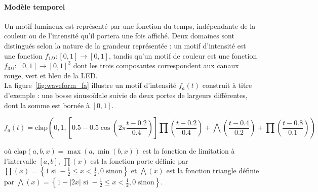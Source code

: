 \paragraph{Modèle temporel} Un motif lumineux est représenté par une fonction du temps, indépendante de la couleur ou de
l'intensité qu'il portera une fois affiché. Deux domaines sont distingués selon la nature de la grandeur représentée : un motif
d'intensité est une fonction $f_{1D} : [0,1] \to [0,1]$, tandis qu'un motif de couleur est une fonction $f_{3D} : [0,1] \to [0,1]^3$
dont les trois composantes correspondent aux canaux rouge, vert et bleu de la LED.\\

La figure~\ref{fig:waveform_fa} illustre un motif d'intensité $f_a(t)$ construit à titre d'exemple : une bosse sinusoïdale
suivie de deux portes de largeurs différentes, dont la somme est bornée à $[0,1]$.

$$ f_a(t) = \text{clap}\left(0, 1, \left[0.5 - 0.5 \cos{\left(2\pi\frac{t - 0.2}{0.4}\right)}\right]\prod\left(\frac{t-0.2}{0.4}\right) + \bigwedge\left(\frac{t-0.4}{0.2}\right)+ \prod\left(\frac{t-0.8}{0.1}\right)\right)$$ %

\noindent où $\text{clap}(a, b, x) = \max(a, \min(b, x))$ est la fonction de limitation à l'intervalle
$[a,b]$, $\prod(x)$ est la fonction porte définie par $\prod(x) = \left\{1 \text{ si } -\frac{1}{2} \leq x < \frac{1}{2}, 0 \text{ sinon}\right\}$
et $\bigwedge(x)$ est la fonction triangle définie par $\bigwedge(x) = \left\{1 - |2x| \text{ si } -\frac{1}{2} \leq x < \frac{1}{2}, 0 \text{ sinon}\right\}$.\\

\pgfplotsset{compat=1.18}



